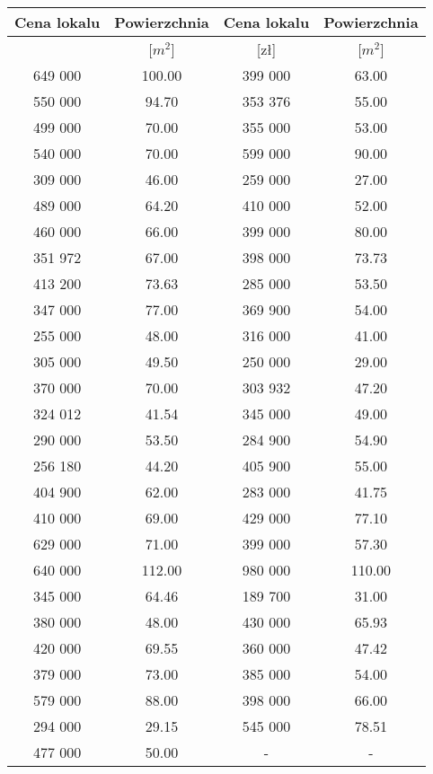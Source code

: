 \begin{tabular}{|c|c|c|c|}
	\hline
	Cena lokalu & Powierzchnia & Cena lokalu & Powierzchnia\\
	\hline
	[zł] & [$m^{2}$] & [zł] & [$m^{2}$]\\
	\hline
649 000 & 100.00 & 399 000 & 63.00\\
	\hline
550 000 & 94.70 & 353 376 & 55.00\\
	\hline
499 000 & 70.00 & 355 000 & 53.00\\
	\hline
540 000 & 70.00 & 599 000 & 90.00\\
	\hline
309 000 & 46.00 & 259 000 & 27.00\\
	\hline
489 000 & 64.20 & 410 000 & 52.00\\
	\hline
460 000 & 66.00 & 399 000 & 80.00\\
	\hline
351 972 & 67.00 & 398 000 & 73.73\\
	\hline
413 200 & 73.63 & 285 000 & 53.50\\
	\hline
347 000 & 77.00 & 369 900 & 54.00\\
	\hline
255 000 & 48.00 & 316 000 & 41.00\\
	\hline
305 000 & 49.50 & 250 000 & 29.00\\
	\hline
370 000 & 70.00 & 303 932 & 47.20\\
	\hline
324 012 & 41.54 & 345 000 & 49.00\\
	\hline
290 000 & 53.50 & 284 900 & 54.90\\
	\hline
256 180 & 44.20 & 405 900 & 55.00\\
	\hline
404 900 & 62.00 & 283 000 & 41.75\\
	\hline
410 000 & 69.00 & 429 000 & 77.10\\
	\hline
629 000 & 71.00 & 399 000 & 57.30\\
	\hline
640 000 & 112.00 & 980 000 & 110.00\\
	\hline
345 000 & 64.46 & 189 700 & 31.00\\
	\hline
380 000 & 48.00 & 430 000 & 65.93\\
	\hline
420 000 & 69.55 & 360 000 & 47.42\\
	\hline
379 000 & 73.00 & 385 000 & 54.00\\
	\hline
579 000 & 88.00 & 398 000 & 66.00\\
	\hline
294 000 & 29.15 & 545 000 & 78.51\\
	\hline
477 000 & 50.00 & - & -\\
	\hline
\end{tabular}

